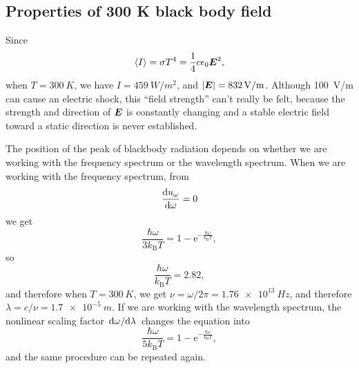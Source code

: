 \documentclass[hyperref, a4paper]{article}
\newcommand*{\ee}{\mathrm{e}}
\newcommand{\kB}{k_{\text{B}}}
\begin{document}
\subsection{Properties of 300 K black body field}

Since 
\begin{equation}
    \expval{I} = \sigma T^4 = \frac{1}{4} c \epsilon_0 \vb*{E}^2,
\end{equation}
when $T = \SI{300}{K}$, we have 
$I = \SI{459}{W/m^2}$,
and $\abs{\vb*{E}} = \SI{832}{V/m}$.
Although \SI{100}{V/m} can cause an electric shock,
this ``field strength'' can't really be felt,
because the strength and direction of $\vb*{E}$ is constantly changing 
and a stable electric field toward a static direction is never established.

The position of the peak of blackbody radiation 
depends on whether we are working with 
the frequency spectrum or the wavelength spectrum. 
When we are working with the frequency spectrum,
from 
\[
    \dv{u_\omega}{\omega} = 0 
\]
we get 
\begin{equation}
    \frac{\hbar \omega}{3 \kB T} = 1- \ee^{- \frac{\hbar \omega}{\kB T}},
\end{equation}
so 
\begin{equation}
    \frac{\hbar \omega}{\kB T} = 2.82, 
\end{equation}
and therefore when $T = \SI{300}{K}$,
we get $\nu = \omega / 2\pi = \SI{1.76e13}{Hz}$,
and therefore $\lambda = c / \nu = \SI{1.7e-5}{m}$.
If we are working with the wavelength spectrum, 
the nonlinear scaling factor $\dv*{\omega}{\lambda}$ changes the equation into 
\begin{equation}
    \frac{\hbar \omega}{5 \kB T} = 1- \ee^{- \frac{\hbar \omega}{\kB T}},
\end{equation}
and the same procedure can be repeated again. 
\end{document}
